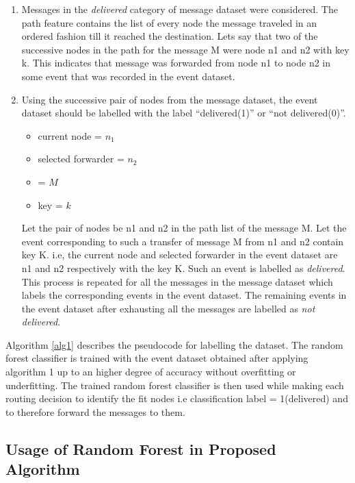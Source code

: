 \documentclass[10pt,journal]{IEEEtran}
\begin{document}
\begin {enumerate}
    \item Messages in the \emph{delivered} category of message dataset were considered. The path feature contains the list of every node the message traveled in an ordered fashion till it reached the destination. Let\textquotesingle s say that two of the successive nodes in the path for the message  M were node n1 and n2 with key k. This indicates that message was forwarded from node n1 to node n2 in some event that was recorded in the event dataset. 
	\item Using the successive pair of nodes from the message dataset, the event dataset should be labelled with the label “delivered(1)” or “not delivered(0)”. 
	\begin {itemize}
		\item current node = $n_1$ 
        \item selected forwarder = $n_2$  
        \item {} = $M$  
        \item key = $k$ 
	\end {itemize}
	Let the pair of nodes be n1 and n2 in the path list of the message M. Let the event corresponding to such a transfer of message M from n1 and n2 contain key K. i.e, the current node and selected forwarder in the event dataset are n1 and n2 respectively with the key K. Such an event is labelled as \emph{delivered}. This process is repeated for all the messages in the message dataset which labels the corresponding events in the event dataset. The remaining events in the event dataset after exhausting all the messages are labelled as \emph{not delivered}. 
\end{enumerate}
Algorithm \ref{alg1} describes the pseudocode for labelling the dataset. The random forest classifier is trained with the event dataset obtained after applying algorithm 1 up to an higher degree of accuracy without overfitting or underfitting.
The trained random forest classifier is then used while making each routing decision to identify the fit nodes i.e classification label = 1(delivered) and to therefore forward the messages to them.

\subsection{Usage of Random Forest in Proposed Algorithm}
\end{document}
